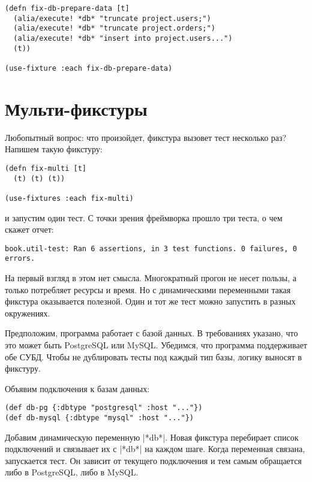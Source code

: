 \begin{verbatim}
(defn fix-db-prepare-data [t]
  (alia/execute! *db* "truncate project.users;")
  (alia/execute! *db* "truncate project.orders;")
  (alia/execute! *db* "insert into project.users...")
  (t))

(use-fixture :each fix-db-prepare-data)
\end{verbatim}

\section{Мульти-фикстуры}

Любопытный вопрос: что произойдет, фикстура вызовет тест несколько раз? Напишем
такую фикстуру:

\begin{verbatim}
(defn fix-multi [t]
  (t) (t) (t))

(use-fixtures :each fix-multi)
\end{verbatim}

\noindent
и запустим один тест. С точки зрения фреймворка прошло три теста, о чем скажет
отчет:

\begin{verbatim}
book.util-test: Ran 6 assertions, in 3 test functions. 0 failures, 0 errors.
\end{verbatim}

На первый взгляд в этом нет смысла. Многократный прогон не несет пользы, а
только потребляет ресурсы и время. Но с динамическими переменными такая фикстура
оказывается полезной. Один и тот же тест можно запустить в разных окружениях.

Предположим, программа работает с базой данных. В требованиях указано, что это
может быть PostgreSQL или MySQL. Убедимся, что программа поддерживает обе
СУБД. Чтобы не дублировать тесты под каждый тип базы, логику выносят в фикстуру.

Объявим подключения к базам данных:

\begin{verbatim}
(def db-pg {:dbtype "postgresql" :host "..."})
(def db-mysql {:dbtype "mysql" :host "..."})
\end{verbatim}

Добавим динамическую переменную \spverb|*db*|. Новая фикстура перебирает список
подключений и связывает их с \spverb|*db*| на каждом шаге. Когда переменная
связана, запускается тест. Он зависит от текущего подключения и тем самым
обращается либо в PostgreSQL, либо в MySQL.

